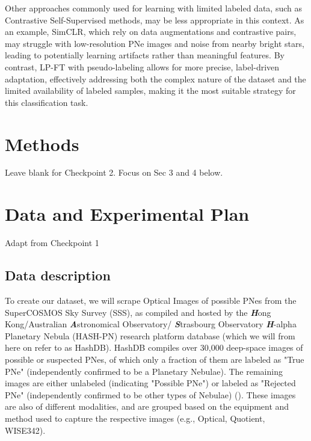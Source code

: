 \documentclass{article}
\begin{document}

Other approaches commonly used for learning with limited labeled data, such as Contrastive Self-Supervised methods, may be less appropriate in this context. As an example, SimCLR, which rely on data augmentations and contrastive pairs, may struggle with low-resolution PNe images and noise from nearby bright stars, leading to potentially learning artifacts rather than meaningful features. By contrast, LP-FT with pseudo-labeling allows for more precise, label-driven adaptation, effectively addressing both the complex nature of the dataset and the limited availability of labeled samples, making it the most suitable strategy for this classification task.

\section{Methods}

{\color{red} Leave blank for Checkpoint 2. Focus on Sec 3 and 4 below.}

\section{Data and Experimental Plan}

{\color{red} Adapt from Checkpoint 1}

\subsection{Data description}
To create our dataset, we will scrape Optical Images of possible PNes from the SuperCOSMOS Sky Survey (SSS), as compiled and hosted by the \textbf{\textit{H}}ong Kong/Australian \textbf{\textit{A}}stronomical Observatory/ \textbf{\textit{S}}trasbourg Observatory \textbf{\textit{H}}-alpha Planetary Nebula (HASH-PN) research platform database (which we will from here on refer to as HashDB). HashDB compiles over 30,000 deep-space images of possible or suspected PNes, of which only a fraction of them are labeled as "True PNe" (independently confirmed to be a Planetary Nebulae). The remaining images are either unlabeled (indicating "Possible PNe") or labeled as "Rejected PNe" (independently confirmed to be other types of Nebulae) (\cite{parker2016hash}). These images are also of different modalities, and are grouped based on the equipment and method used to capture the respective images (e.g., Optical, Quotient, WISE342).
\end{document}
